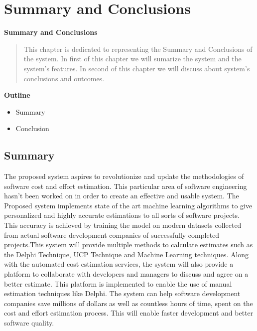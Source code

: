 \section{Summary and Conclusions}

\vspace{20mm}


\Huge{\textbf{Summary and Conclusions}}

\vspace{20mm}


\begin{abstract}

    This chapter is dedicated to representing the Summary and Conclusions of the system.
    In first of this chapter we will sumarize the system and the system's features.
    In second of this chapter we will discuss about system's conclusions and outcomes.



\end{abstract}

\vspace{20mm}

\large{\textbf{Outline}}

\begin{center}
    \begin{itemize}
        \item Summary
        \item Conclusion
    \end{itemize}
\end{center}
\pagebreak


\subsection{Summary}
The proposed system aspires to revolutionize and update the methodologies of software cost and effort
estimation. This particular area of software engineering hasn’t been worked on in order to create an
effective and usable system. The Proposed system implements state of the art machine learning algorithms
to give personalized and highly accurate estimations to all sorts of software projects. This accuracy is
achieved by training the model on modern datasets collected from actual software development companies
of successfully completed projects.This system will provide multiple methods to calculate estimates such
as the Delphi Technique, UCP Technique and Machine Learning techniques.
Along with the automated cost estimation services, the system will also provide a platform to collaborate
with developers and managers to discuss and agree on a better estimate. This platform is implemented to
enable the use of manual estimation techniques like Delphi.
The system can help software development companies save millions of dollars as well as countless hours
of time, spent on the cost and effort estimation process. This will enable faster development and better
software quality.
